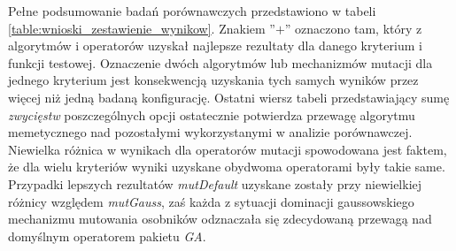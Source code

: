 \par
Pełne podsumowanie badań porównawczych przedstawiono w tabeli \ref{table:wnioski_zestawienie_wynikow}. Znakiem ''$+$'' oznaczono tam, który z algorytmów i operatorów uzyskał najlepsze rezultaty dla danego kryterium i funkcji testowej. Oznaczenie dwóch algorytmów lub mechanizmów mutacji dla jednego kryterium jest konsekwencją uzyskania tych samych wyników przez więcej niż jedną badaną konfigurację. Ostatni wiersz tabeli przedstawiający sumę \emph{zwycięstw} poszczególnych opcji ostatecznie potwierdza przewagę algorytmu memetycznego nad pozostałymi wykorzystanymi w analizie porównawczej. Niewielka różnica w wynikach dla operatorów mutacji spowodowana jest faktem, że dla wielu kryteriów wyniki uzyskane obydwoma operatorami były takie same. Przypadki lepszych rezultatów \emph{mutDefault} uzyskane zostały przy niewielkiej różnicy względem \emph{mutGauss}, zaś każda z sytuacji dominacji gaussowskiego mechanizmu mutowania osobników odznaczała się zdecydowaną przewagą nad domyślnym operatorem pakietu \emph{GA}.
 


